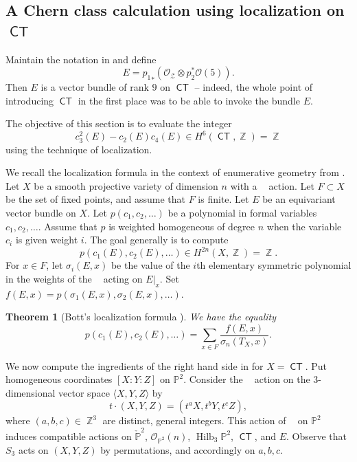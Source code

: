 \documentclass[reqno, 11pt]{amsart}
\theoremstyle{plain}
\newtheorem{theorem}{Theorem}[section]
\theoremstyle{remark}
\renewcommand{\P}{\mathbb{P}}
\DeclareMathOperator{\Hilb}{Hilb}
\renewcommand{\O}{\mathcal{O}}
\DeclareMathOperator{\CT}{\mathsf{CT}}
\DeclareMathOperator{\Gm}{\mathbb{G}_{m}}
\DeclareMathOperator{\Z}{\mathbb{Z}}
\begin{document}
\subsection{A Chern class calculation using localization on $\CT$}
\label{sec:Chern}
Maintain the notation in  and define 
\[ E = {p_1}_* \left(\O_{\mathcal{Z}} \otimes p_2^* \O(5)\right).\] Then $E$ is a vector bundle of rank
$9$ on $\CT$ -- indeed, the whole point of introducing $\CT$ in the first
place was to be able to invoke the bundle $E$.




The objective of this section is to evaluate the integer
\[  c_{3}^2(E) - c_{2} (E) c_{4}(E) \in H^6(\CT, \Z) = \Z\] using the
technique of localization.

We recall the localization formula in the context of enumerative
geometry from \cite{ell.str}.  Let $X$ be a smooth projective variety
of dimension $n$ with a $\Gm$ action.  Let $F \subset X$ be the set of
fixed points, and assume that $F$ is finite.  Let $E$ be an
equivariant vector bundle on $X$.  Let $p(c_1, c_2, \dots)$ be a
polynomial in formal variables $c_1, c_2, \dots$.  Assume that $p$ is
weighted homogeneous of degree $n$ when the variable $c_i$ is given
weight $i$.  The goal generally is to compute
\[ p(c_1(E), c_2(E), \dots ) \in H^{2n}(X, \Z) = \Z.\] For $x \in F$,
let $\sigma_i(E, x)$ be the value of the $i$th
elementary symmetric polynomial in the weights of the $\Gm$ acting on
$E|_x$.  Set $f(E, x) = p(\sigma_1(E, x), \sigma_2(E,x), \dots)$.
\begin{theorem}[{Bott's localization formula
    \cite[Theorem~2.2]{ell.str}}]
  \label{thm:localization}
  We have the equality
  \[ p(c_1(E), c_2(E), \dots ) = \sum_{x \in F} \frac{f(E, x)}{\sigma_n(T_X, x)}. \]
\end{theorem}

We now compute the ingredients of the right hand side in
 for $X = \CT$.  Put homogeneous coordinates
$[X:Y:Z]$ on $\P^2$.  Consider the $\Gm$ action on the $3$-dimensional vector space $\langle X, Y, Z \rangle$ by
\[ t \cdot (X, Y, Z) = (t^a X, t^b Y, t^c Z),\] where
$(a,b,c) \in \Z^3$ are distinct, general integers.  This action of $\Gm$ on
$\P^2$ induces compatible actions on $\check{\P}^{2}$, $\O_{\P^2}(n)$, $\Hilb_3 \P^2$, $\CT$, and
$E$.  Observe that $S_3$ acts on $(X,Y,Z)$ by permutations, and accordingly on $a,b,c$.
\end{document}
